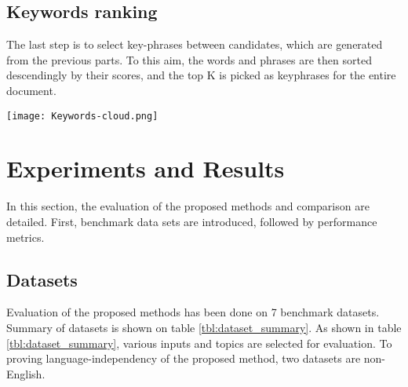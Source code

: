 \documentclass[3p]{elsarticle}
\begin{document}
\subsection{Keywords ranking}
The last step is to select key-phrases between candidates, which are generated from the previous parts. To this aim, the words and phrases are then sorted descendingly by their scores, and the top K is picked as keyphrases for the entire document.

    \begin{minipage}{\textwidth}
        \centering
        \texttt{[image: Keywords-cloud.png]}
        \label{fig:word-cloud}
    \end{minipage}

\section{Experiments and Results}   \label{sec:experiments_results}
In this section, the evaluation of the proposed methods and comparison are detailed. First, benchmark data sets are introduced, followed by performance metrics.



















\subsection{Datasets}   \label{subsec:dataset}
Evaluation of the proposed methods has been done on 7 benchmark datasets. Summary of datasets is shown on table \ref{tbl:dataset_summary}. As shown in table \ref{tbl:dataset_summary}, various inputs and topics are selected for evaluation. To proving language-independency of the proposed method, two datasets are non-English.
\end{document}
